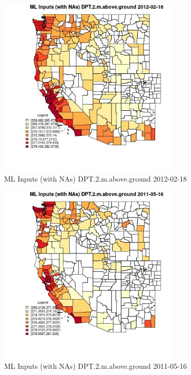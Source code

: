 \begin{figure} 
\centering  
\includegraphics[width=0.77\textwidth]{Code_Outputs/Report_ML_input_PM25_Step4_part_f_de_duplicated_aves_prioritize_24hr_obswNAs_CountyDPT2mabovegroundMean2012-02-18.jpg} 
\caption{\label{fig:Report_ML_input_PM25_Step4_part_f_de_duplicated_aves_prioritize_24hr_obswNAsCountyDPT2mabovegroundMean2012-02-18}ML Inputs (with NAs) DPT.2.m.above.ground 2012-02-18} 
\end{figure} 
 

\begin{figure} 
\centering  
\includegraphics[width=0.77\textwidth]{Code_Outputs/Report_ML_input_PM25_Step4_part_f_de_duplicated_aves_prioritize_24hr_obswNAs_CountyDPT2mabovegroundMean2011-05-16.jpg} 
\caption{\label{fig:Report_ML_input_PM25_Step4_part_f_de_duplicated_aves_prioritize_24hr_obswNAsCountyDPT2mabovegroundMean2011-05-16}ML Inputs (with NAs) DPT.2.m.above.ground 2011-05-16} 
\end{figure} 
 

